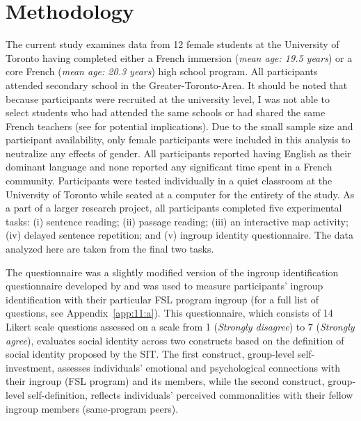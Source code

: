 \documentclass[output=paper,colorlinks,citecolor=brown,draftmode]{langscibook}
\begin{document}
\section{Methodology}\label{sec:11:3}
The current study examines data from 12 female students at the University of Toronto having completed either a French immersion (\textit{mean age: 19.5 years}) or a core French (\textit{mean age: 20.3 years}) high school program. All participants attended secondary school in the Greater-Toronto-Area. It should be noted that because participants were recruited at the university level, I was not able to select students who had attended the same schools or had shared the same French teachers (see  for potential implications). Due to the small sample size and participant availability, only female participants were included in this analysis to neutralize any effects of gender. All participants reported having English as their dominant language and none reported any significant time spent in a French community. Participants were tested individually in a quiet classroom at the University of Toronto while seated at a computer for the entirety of the study. As a part of a larger research project, all participants completed five experimental tasks: (i) sentence reading; (ii) passage reading; (iii) an interactive map activity; (iv) delayed sentence repetition; and (v) ingroup identity questionnaire. The data analyzed here are taken from the final two tasks.


The questionnaire was a slightly modified version of the ingroup identification questionnaire developed by \citet{LeachSpears2008} and was used to measure participants’ ingroup identification with their particular FSL program ingroup (for a full list of questions, see Appendix~\ref{app:11:a}). This questionnaire, which consists of 14 Likert scale questions assessed on a scale from 1 (\textit{Strongly disagree}) to 7 (\textit{Strongly agree}), evaluates social identity across two constructs based on the definition of social identity proposed by the SIT. The first construct, group-level self-investment, assesses individuals’ emotional and psychological connections with their ingroup (FSL program) and its members, while the second construct, group-level self-definition, reflects individuals’ perceived commonalities with their fellow ingroup members (same-program peers).
\end{document}
